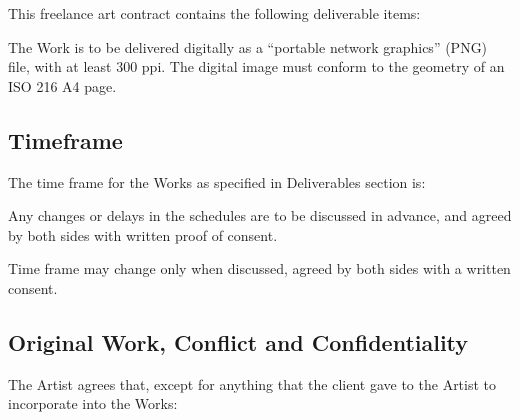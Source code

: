 \documentclass[10pt]{scrartcl}
\begin{document}
This freelance art contract contains the following deliverable items:

\begin{mdframed}
\end{mdframed}

The Work is to be delivered digitally as a ``portable network graphics'' (PNG)
file, with at least 300 ppi. The digital image must conform to the geometry
of an ISO 216 A4 page.

\subsection{Timeframe}

The time frame for the Works as specified in Deliverables section is:

\begin{mdframed}
\end{mdframed}

Any changes or delays in the schedules are to be discussed in advance, and
agreed by both sides with written proof of consent.

Time frame may change only when discussed, agreed by both sides with a written
consent.

\subsection{Original Work, Conflict and Confidentiality}

The Artist agrees that, except for anything that the client gave to
the Artist to incorporate into the Works:
\end{document}
